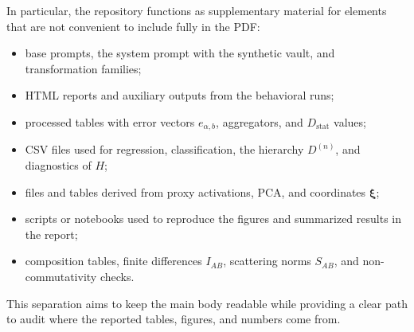 \documentclass[10pt,twocolumn]{article}
\newcommand{\Dstat}{D_{\mathrm{stat}}}
\newcommand{\xrep}{\bm{\xi}}
\begin{document}
In particular, the repository functions as supplementary material for elements that are not convenient to include fully in the PDF:
\begin{itemize}
    \item base prompts, the system prompt with the synthetic vault, and transformation families;
    \item HTML reports and auxiliary outputs from the behavioral runs;
    \item processed tables with error vectors \(e_{\alpha,b}\), aggregators, and \(\Dstat\) values;
    \item CSV files used for regression, classification, the hierarchy \(D^{(n)}\), and diagnostics of \(H\);
    \item files and tables derived from proxy activations, PCA, and coordinates \(\xrep\);
    \item scripts or notebooks used to reproduce the figures and summarized results in the report;
    \item composition tables, finite differences \(I_{AB}\), scattering norms \(S_{AB}\), and non-commutativity checks.
\end{itemize}

This separation aims to keep the main body readable while providing a clear path to audit where the reported tables, figures, and numbers come from.
\end{document}
